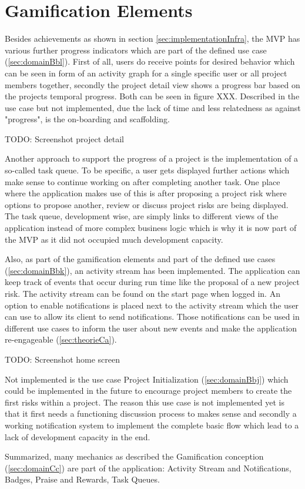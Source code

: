 
\section{Gamification Elements}
\label{sec:implementationGami}

Besides achievements as shown in section \ref{sec:implementationInfra}, the MVP has various further progress indicators which are part of the defined use case (\ref{sec:domainBbl}). First of all, users do receive points for desired behavior which can be seen in form of an activity graph for a single specific user or all project members together, secondly the project detail view shows a progress bar based on the projects temporal progress. Both can be seen in figure XXX. Described in the use case  but not implemented, due the lack of time and less relatedness as against "progress", is the on-boarding and scaffolding.

TODO: Screenshot project detail

Another approach to support the progress of a project is the implementation of a so-called task queue. To be specific, a user gets displayed further actions which make sense to continue working on after completing another task. One place where the application makes use of this is after proposing a project risk where options to propose another, review or discuss project risks are being displayed. The task queue, development wise, are simply links to different views of the application instead of more complex business logic which is why it is now part of the MVP as it did not occupied much development capacity.

Also, as part of the gamification elements and part of the defined use cases (\ref{sec:domainBbk}), an activity stream has been implemented. The application can keep track of events that occur during run time like the proposal of a new project risk. The activity stream can be found on the start page when logged in. An option to enable notifications is placed next to the activity stream which the user can use to allow its client to send notifications. Those notifications can be used in different use cases to inform the user about new events and make the application re-engageable (\ref{sec:theorieCa}).

TODO: Screenshot home screen

Not implemented is the use case Project Initialization (\ref{sec:domainBbj}) which could be implemented in the future to encourage project members to create the first risks within a project. The reason this use case is not implemented yet is that it first needs a functioning discussion process to makes sense and secondly a working notification system to implement the complete basic flow which lead to a lack of development capacity in the end.

Summarized, many mechanics as described the Gamification conception (\ref{sec:domainCc}) are part of the application: Activity Stream and Notifications, Badges, Praise and Rewards, Task Queues.